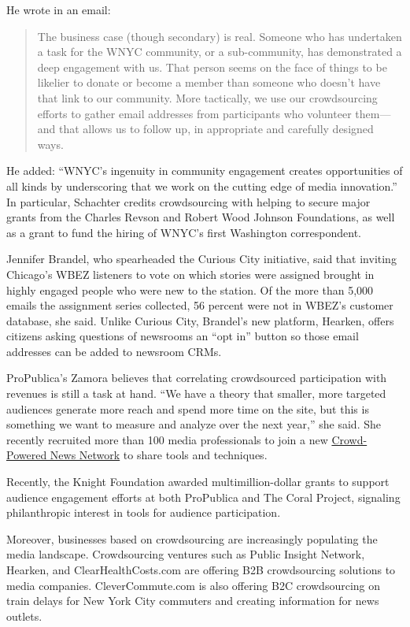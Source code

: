 \documentclass[notoc, symmetric, nobib, nols]{towcenter-guideto-book}
\begin{document}
He wrote in an email:
\begin{quote}
The business case (though secondary) is real. Someone who has undertaken a task for the WNYC community, or a sub-community, has demonstrated a deep engagement with us. That person seems on the face of things to be likelier to donate or become a member than someone who doesn't have that link to our community. More tactically, we use our crowdsourcing efforts to gather email addresses from participants who volunteer them---and that allows us to follow up, in appropriate and carefully designed ways.
\end{quote}
He added: ``WNYC's ingenuity in community engagement creates opportunities of all kinds by underscoring that we work on the cutting edge of media innovation.'' In particular, Schachter credits crowdsourcing with helping to secure major grants from the Charles Revson and Robert Wood Johnson Foundations, as well as a grant to fund the hiring of WNYC's first Washington correspondent. 

Jennifer Brandel, who spearheaded the Curious City initiative, said that inviting Chicago's WBEZ listeners to vote on which stories were assigned brought in highly engaged people who were new to the station. Of the more than 5,000 emails the assignment series collected, 56 percent were not in WBEZ's customer database, she said. Unlike Curious City, Brandel's new platform, Hearken, offers citizens asking questions of newsrooms an ``opt in'' button so those email addresses can be added to newsroom CRMs.%

ProPublica's Zamora believes that correlating crowdsourced participation with revenues is still a task at hand. ``We have a theory that smaller, more targeted audiences generate more reach and spend more time on the site, but this is something we want to measure and analyze over the next year,'' she said. She recently recruited more than 100 media professionals to join a new \href{https://docs.google.com/forms/d/170joKlpiLfn8qlnT7lxSJgJKq1IDg_KVilezkbE68U0/viewform}{Crowd-Powered News Network} to share tools and techniques.\autocite{CPNN} 

Recently, the Knight Foundation awarded multimillion-dollar grants to support audience engagement efforts at both ProPublica and The Coral Project, signaling philanthropic interest in tools for audience participation. 

Moreover, businesses based on crowdsourcing are increasingly populating the media landscape. Crowdsourcing ventures such as Public Insight Network, Hearken, and ClearHealthCosts.com %
are offering B2B crowdsourcing solutions to media companies. CleverCommute.com is also offering B2C crowdsourcing on train delays for New York City commuters and creating information for news outlets.
\end{document}
